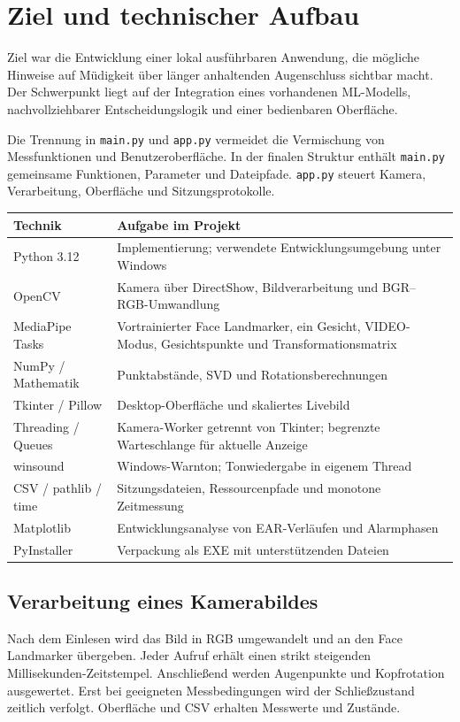 \documentclass[11pt,a4paper]{article}
\newcommand{\code}[1]{{\small\nolinkurl{#1}}}
\begin{document}
\section{Ziel und technischer Aufbau}
Ziel war die Entwicklung einer lokal ausführbaren Anwendung, die mögliche Hinweise auf Müdigkeit über länger anhaltenden Augenschluss sichtbar macht. Der Schwerpunkt liegt auf der Integration eines vorhandenen ML-Modells, nachvollziehbarer Entscheidungslogik und einer bedienbaren Oberfläche.

Die Trennung in \code{main.py} und \code{app.py} vermeidet die Vermischung von Messfunktionen und Benutzeroberfläche. In der finalen Struktur enthält \code{main.py} gemeinsame Funktionen, Parameter und Dateipfade. \code{app.py} steuert Kamera, Verarbeitung, Oberfläche und Sitzungsprotokolle.
\begin{tabularx}{\textwidth}{@{}p{38mm}Y@{}}\toprule
Technik & Aufgabe im Projekt\\\midrule
Python 3.12 & Implementierung; verwendete Entwicklungsumgebung unter Windows\\
OpenCV & Kamera über DirectShow, Bildverarbeitung und BGR--RGB-Umwandlung\\
MediaPipe Tasks & Vortrainierter Face Landmarker, ein Gesicht, VIDEO-Modus, Gesichtspunkte und Transformationsmatrix\,\cite{mp}\\
NumPy / Mathematik & Punktabstände, SVD und Rotationsberechnungen\\
Tkinter / Pillow & Desktop-Oberfläche und skaliertes Livebild\\
Threading / Queues & Kamera-Worker getrennt von Tkinter; begrenzte Warteschlange für aktuelle Anzeige\\
winsound & Windows-Warnton; Tonwiedergabe in eigenem Thread\\
CSV / pathlib / time & Sitzungsdateien, Ressourcenpfade und monotone Zeitmessung\\
Matplotlib & Entwicklungsanalyse von EAR-Verläufen und Alarmphasen\\
PyInstaller & Verpackung als EXE mit unterstützenden Dateien\,\cite{pyi}\\\bottomrule
\end{tabularx}
\subsection*{Verarbeitung eines Kamerabildes}
Nach dem Einlesen wird das Bild in RGB umgewandelt und an den Face Landmarker übergeben. Jeder Aufruf erhält einen strikt steigenden Millisekunden-Zeitstempel. Anschließend werden Augenpunkte und Kopfrotation ausgewertet. Erst bei geeigneten Messbedingungen wird der Schließzustand zeitlich verfolgt. Oberfläche und CSV erhalten Messwerte und Zustände.
\end{document}
